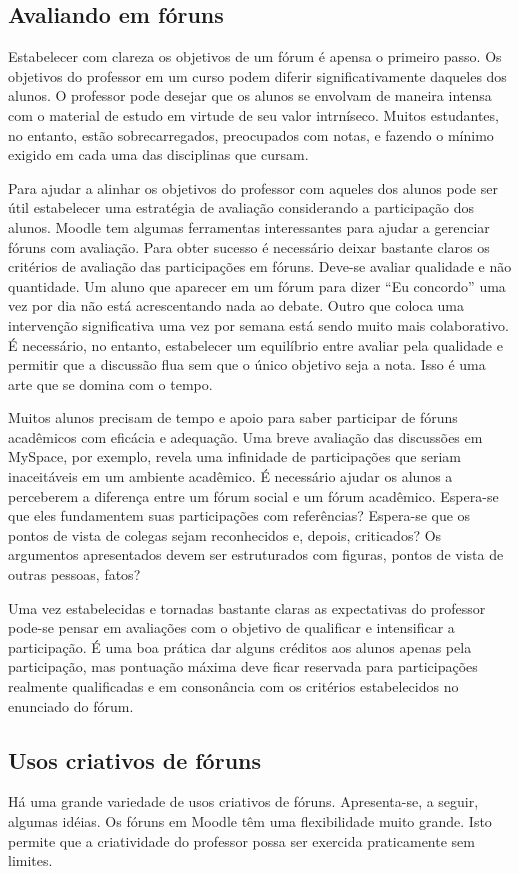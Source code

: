 \subsection{Avaliando em fóruns}
Estabelecer com clareza os objetivos de um fórum é apensa o primeiro passo. Os objetivos do professor em um curso podem diferir significativamente daqueles dos alunos. O professor pode desejar que os alunos se envolvam de maneira intensa com o material de estudo em virtude de seu valor intrníseco. Muitos estudantes, no entanto, estão sobrecarregados, preocupados com notas, e fazendo o mínimo exigido em cada uma das disciplinas que cursam.

Para ajudar a alinhar os objetivos do professor com aqueles dos alunos pode ser útil estabelecer uma estratégia de avaliação considerando a participação dos alunos. Moodle tem algumas ferramentas interessantes para ajudar a gerenciar fóruns com avaliação. Para obter sucesso é necessário deixar bastante claros os critérios de avaliação das participações em fóruns. Deve-se avaliar qualidade e não quantidade.  Um aluno que aparecer em um fórum para dizer “Eu concordo” uma vez por dia não está acrescentando nada ao debate. Outro que coloca uma intervenção significativa uma vez por semana está sendo muito mais colaborativo. É necessário, no entanto, estabelecer um equilíbrio entre avaliar pela qualidade e permitir que a discussão flua sem que o único objetivo seja a nota. Isso é uma arte que se domina com o tempo.

Muitos alunos precisam de tempo e apoio para saber participar de fóruns acadêmicos com eficácia e adequação. Uma breve avaliação das discussões em MySpace, por exemplo, revela uma infinidade de participações que seriam inaceitáveis em um ambiente acadêmico. É necessário ajudar os alunos a perceberem a diferença entre um fórum social e um fórum acadêmico. Espera-se que eles fundamentem suas participações com referências? Espera-se que os pontos de vista de colegas sejam reconhecidos e, depois, criticados? Os argumentos apresentados devem ser estruturados com figuras, pontos de vista de outras pessoas, fatos?

Uma vez estabelecidas e tornadas bastante claras as expectativas do professor pode-se pensar em avaliações com o objetivo de qualificar e intensificar a participação. É uma boa prática dar alguns créditos aos alunos apenas pela participação, mas pontuação máxima deve ficar reservada para participações realmente qualificadas e em consonância com os critérios estabelecidos no enunciado do fórum.
\subsection{Usos criativos de fóruns}
Há uma grande variedade de usos criativos de fóruns. Apresenta-se, a seguir, algumas idéias. Os fóruns em Moodle têm uma flexibilidade muito grande. Isto permite que a criatividade do professor possa ser exercida praticamente sem limites.
